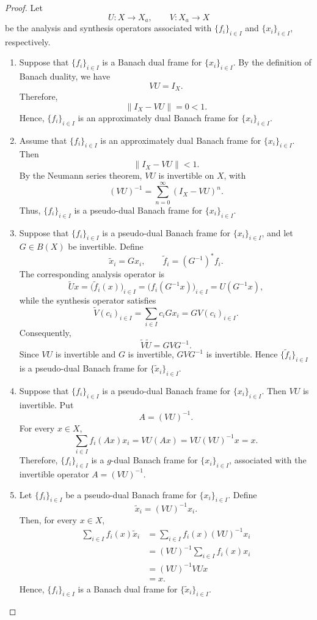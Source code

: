 \documentclass[12pt]{article}
\theoremstyle{definition}
\theoremstyle{remark}
\begin{document}
\begin{proof}
	Let
	\[
	U:X\to X_a,\qquad V:X_a\to X
	\]
	be the analysis and synthesis operators associated with
	\(\{f_i\}_{i\in I}\) and \(\{x_i\}_{i\in I}\), respectively.
	
	\begin{enumerate}
		\item Suppose that \(\{f_i\}_{i\in I}\) is a Banach dual frame for
		\(\{x_i\}_{i\in I}\). By the definition of Banach duality, we have
		\[
		VU=I_X.
		\]
		Therefore,
		\[
		\|I_X-VU\|=0<1.
		\]
		Hence, \(\{f_i\}_{i\in I}\) is an approximately dual Banach frame
		for \(\{x_i\}_{i\in I}\).
		
		\item Assume that \(\{f_i\}_{i\in I}\) is an approximately dual
		Banach frame for \(\{x_i\}_{i\in I}\). Then
		\[
		\|I_X-VU\|<1.
		\]
		By the Neumann series theorem, \(VU\) is invertible on \(X\), with
		\[
		(VU)^{-1}
		=
		\sum_{n=0}^{\infty}(I_X-VU)^n.
		\]
		Thus, \(\{f_i\}_{i\in I}\) is a pseudo-dual Banach frame for
		\(\{x_i\}_{i\in I}\).
		
		\item Suppose that \(\{f_i\}_{i\in I}\) is a pseudo-dual Banach
		frame for \(\{x_i\}_{i\in I}\), and let \(G\in B(X)\) be invertible.
		Define
		\[
		\widetilde{x}_i=Gx_i,
		\qquad
		\widetilde{f}_i=(G^{-1})^*f_i.
		\]
		The corresponding analysis operator is
		\[
		\widetilde{U}x
		=
		\bigl(\widetilde{f}_i(x)\bigr)_{i\in I}
		=
		\bigl(f_i(G^{-1}x)\bigr)_{i\in I}
		=
		U(G^{-1}x),
		\]
		while the synthesis operator satisfies
		\[
		\widetilde{V}(c_i)_{i\in I}
		=
		\sum_{i\in I}c_iGx_i
		=
		G V(c_i)_{i\in I}.
		\]
		Consequently,
		\[
		\widetilde{V}\widetilde{U}
		=
		GV G^{-1}.
		\]
		Since \(VU\) is invertible and \(G\) is invertible,
		\(GVG^{-1}\) is invertible. Hence
		\(\{\widetilde{f}_i\}_{i\in I}\) is a pseudo-dual Banach frame
		for \(\{\widetilde{x}_i\}_{i\in I}\).
		
		\item Suppose that \(\{f_i\}_{i\in I}\) is a pseudo-dual Banach
		frame for \(\{x_i\}_{i\in I}\). Then \(VU\) is invertible. Put
		\[
		A=(VU)^{-1}.
		\]
		For every \(x\in X\),
		\[
		\sum_{i\in I}f_i(Ax)x_i
		=
		VU(Ax)
		=
		VU(VU)^{-1}x
		=
		x.
		\]
		Therefore, \(\{f_i\}_{i\in I}\) is a \(g\)-dual Banach frame for
		\(\{x_i\}_{i\in I}\), associated with the invertible operator
		\(A=(VU)^{-1}\).
		
		\item Let \(\{f_i\}_{i\in I}\) be a pseudo-dual Banach frame for
		\(\{x_i\}_{i\in I}\). Define
		\[
		\widetilde{x}_i=(VU)^{-1}x_i.
		\]
		Then, for every \(x\in X\),
		\[
		\begin{aligned}
			\sum_{i\in I}f_i(x)\widetilde{x}_i
			&=
			\sum_{i\in I}f_i(x)(VU)^{-1}x_i\\
			&=
			(VU)^{-1}
			\sum_{i\in I}f_i(x)x_i\\
			&=
			(VU)^{-1}VUx\\
			&=x.
		\end{aligned}
		\]
		Hence, \(\{f_i\}_{i\in I}\) is a Banach dual frame for
		\(\{\widetilde{x}_i\}_{i\in I}\).
		

\end{enumerate}
\end{proof}
\end{document}
